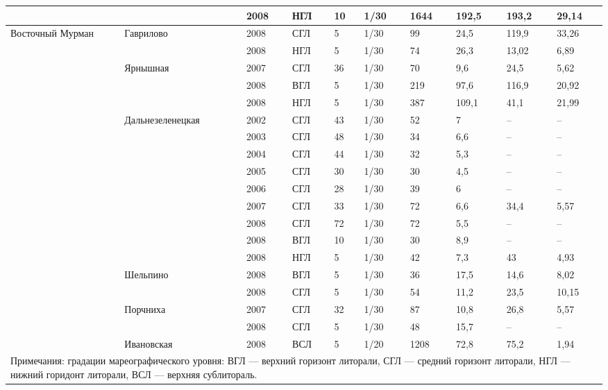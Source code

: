 \begin{footnotesize}
\begin{center}
\begin{longtable}{|p{1.6cm}|p{2.3cm}|p{1cm}|p{1.6cm}|p{1.1cm}|p{1.1cm}|*{4}{p{1cm}|}}
                 &                   & 2008       & НГЛ & 10 & 1/30 & 1644 & 192,5 & 193,2 & 29,14 \\ \hline
Восточный Мурман & Гаврилово         & 2008       & СГЛ & 5  & 1/30 & 99   & 24,5  & 119,9 & 33,26 \\
                 &                   & 2008       & НГЛ & 5  & 1/30 & 74   & 26,3  & 13,02 & 6,89  \\ \cline{2-10}
                 & Ярнышная          & 2007       & СГЛ & 36 & 1/30 & 70   & 9,6   & 24,5  & 5,62  \\
                 &                   & 2008       & ВГЛ & 5  & 1/30 & 219  & 97,6  & 116,9 & 20,92 \\
                 &                   & 2008       & НГЛ & 5  & 1/30 & 387  & 109,1 & 41,1  & 21,99 \\ \cline{2-10}
                 & Даль\-не\-зе\-ле\-нец\-кая  & 2002       & СГЛ & 43 & 1/30 & 52   & 7     & --    & --    \\
                 &                   & 2003       & СГЛ & 48 & 1/30 & 34   & 6,6   & --    & --    \\
                 &                   & 2004       & СГЛ & 44 & 1/30 & 32   & 5,3   & --    & --    \\
                 &                   & 2005       & СГЛ & 30 & 1/30 & 30   & 4,5   & --    & --    \\
                 &                   & 2006       & СГЛ & 28 & 1/30 & 39   & 6     & --    & --    \\
                 &                   & 2007       & СГЛ & 33 & 1/30 & 72   & 6,6   & 34,4  & 5,57  \\
                 &                   & 2008       & СГЛ & 72 & 1/30 & 72   & 5,5   & --    & --    \\
                 &                   & 2008       & ВГЛ & 10 & 1/30 & 30   & 8,9   & --    & --    \\
                 &                   & 2008       & НГЛ & 5  & 1/30 & 42   & 7,3   & 43    & 4,93  \\ \cline{2-10}
                 & Шельпино          & 2008       & ВГЛ & 5  & 1/30 & 36   & 17,5  & 14,6  & 8,02  \\
                 &                   & 2008       & СГЛ & 5  & 1/30 & 54   & 11,2  & 23,5  & 10,15 \\ \cline{2-10}
                 & Порчниха          & 2007       & СГЛ & 32 & 1/30 & 87   & 10,8  & 26,8  & 5,57  \\
                 &                   & 2008       & СГЛ & 5  & 1/30 & 48   & 15,7  & --    & --    \\ \cline{2-10}
                 & Ивановская        & 2008       & ВСЛ & 5  & 1/20 & 1208 & 72,8  & 75,2  & 1,94  \\ \hline
	\multicolumn{10}{p{16cm}}{Примечания: градации мареографического уровня: ВГЛ --- верхний горизонт литорали, СГЛ --- средний горизонт литорали, НГЛ --- нижний горидонт литорали, ВСЛ --- верхняя сублитораль. 

}
\end{longtable}
\end{center}
\end{footnotesize}
